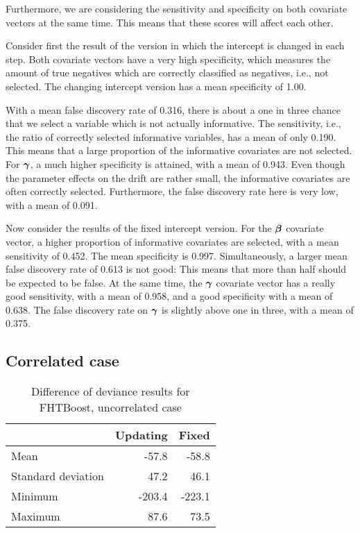 Furthermore, we are considering the sensitivity and specificity on both covariate vectors at the same time.
This means that these scores will affect each other.

Consider first the result of the version in which the intercept is changed in each step.
Both covariate vectors have a very high specificity, which measures the amount of true negatives which are correctly classified as negatives, i.e., not selected.
The changing intercept version has a mean specificity of 1.00.

With a mean false discovery rate of 0.316, there is about a one in three chance that we select a variable which is not actually informative.
The sensitivity, i.e., the ratio of correctly selected informative variables, has a mean of only 0.190.
This means that a large proportion of the informative covariates are not selected.
For $\boldsymbol{\gamma}$, a much higher specificity is attained, with a mean of 0.943.
Even though the parameter effects on the drift are rather small, the informative covariates are often correctly selected.
Furthermore, the false discovery rate here is very low, with a mean of 0.091.

Now consider the results of the fixed intercept version.
For the $\boldsymbol{\beta}$ covariate vector, a higher proportion of informative covariates are selected, with a mean sensitivity of 0.452.
The mean specificity is 0.997.
Simultaneously, a larger mean false discovery rate of 0.613 is not good:
This means that more than half should be expected to be false.
At the same time, the $\boldsymbol{\gamma}$ covariate vector has a really good sensitivity, with a mean of 0.958, and a good specificity with a mean of 0.638.
The false discovery rate on $\boldsymbol{\gamma}$ is slightly above one in three, with a mean of 0.375.


\subsection{Correlated case}

\begin{table}
\caption{Difference of deviance results for FHTBoost, uncorrelated case}
\label{table:uncorrelated-deviance}
\centering
\begin{tabular}{l|rr}
\toprule
& Updating & Fixed \\
\hline
Mean               &  -57.8  &  -58.8  \\
Standard deviation &   47.2  &   46.1  \\
Minimum            & -203.4  & -223.1  \\
Maximum            &   87.6  &   73.5  \\
\bottomrule
\end{tabular}
\end{table}

